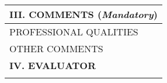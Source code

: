 \documentclass{article}
\begin{document}
{\begin{tabular}{|l|}
{\textbf{III. COMMENTS} (\textit{Mandatory})
}\\
\hline
\hline
\parbox[][\rhXVI][c]{\textwidth}{
PROFESSIONAL QUALITIES\\[1pt]
}\\
\hline
\parbox[][\rhVI][c]{\textwidth}{

OTHER COMMENTS\\[1pt]
}\\
\hline
\parbox[][\rhXVIII][c]{\textwidth}{

\textbf{IV. EVALUATOR}
}\\
\hline
\end{tabular}}
\end{document}
